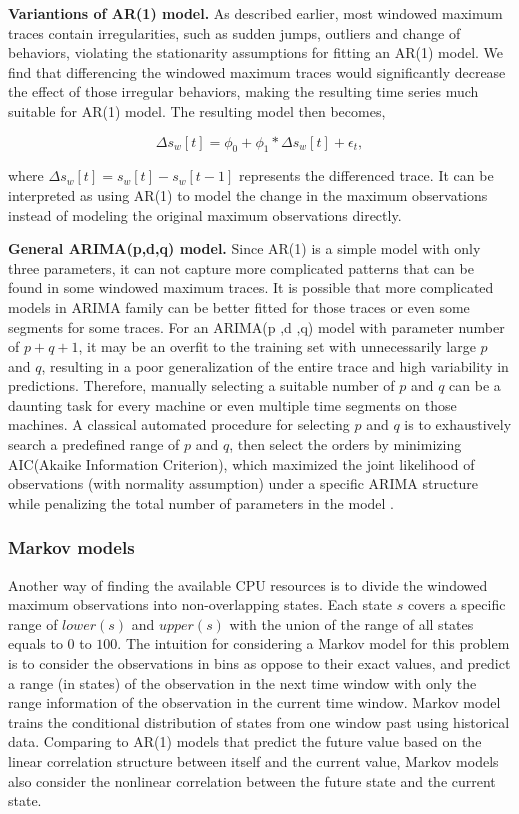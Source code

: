 \documentclass[sigplan,10pt,review,anonymous]{acmart}
\begin{document}
\textbf{Variantions of AR(1) model.} As described earlier, most windowed maximum
traces contain irregularities, such as sudden jumps, outliers and change of
behaviors, violating the stationarity assumptions for fitting an AR(1) model. We
find that differencing the windowed maximum traces would significantly
decrease the effect of those irregular behaviors, making the resulting time
series much suitable for AR(1) model. The resulting model then becomes,

\begin{equation}
  \Delta s_w[t] = \phi_0 + \phi_1 * \Delta s_w[t] + \epsilon_t,
\end{equation}

where $\Delta s_w[t] = s_w[t] - s_w[t - 1]$ represents the differenced trace.
It can be interpreted as using AR(1) to model the change in the maximum
observations instead of modeling the original maximum observations directly.

\textbf{General ARIMA(p,d,q) model.} Since AR(1) is a simple model with only
three parameters, it can not capture more complicated patterns that can be found
in some windowed maximum traces. It is possible that more complicated models in
ARIMA family can be better fitted for those traces or even some segments for
some traces. For an ARIMA(p ,d ,q) model with parameter number of $p + q + 1$,
it may be an overfit to the training set with unnecessarily large $p$ and $q$,
resulting in a poor generalization of the entire trace and high variability in
predictions. Therefore, manually selecting a suitable number of $p$ and $q$ can
be a daunting task for every machine or even multiple time segments on those
machines. A classical automated procedure for selecting $p$ and $q$ is to
exhaustively search a predefined range of $p$ and $q$, then select the orders by
minimizing AIC(Akaike Information Criterion), which maximized the joint
likelihood of observations (with normality assumption) under a specific ARIMA
structure while penalizing the total number of parameters in the model
\cite{10.2307/2346970}.

\subsubsection{Markov models}

Another way of finding the available CPU resources is to divide the windowed
maximum observations into non-overlapping states. Each state $s$ covers a
specific range of $lower(s)$ and $upper(s)$ with the union of the range of all
states equals to $0$ to $100$. The intuition for considering a Markov model for
this problem is to consider the observations in bins as oppose to their exact
values, and predict a range (in states) of the observation in the next time
window with only the range information of the observation in the current time
window. Markov model trains the conditional distribution of states from one
window past using historical data. Comparing to AR(1) models that predict the
future value based on the linear correlation structure between itself and the
current value, Markov models also consider the nonlinear correlation between the
future state and the current state.
\end{document}
